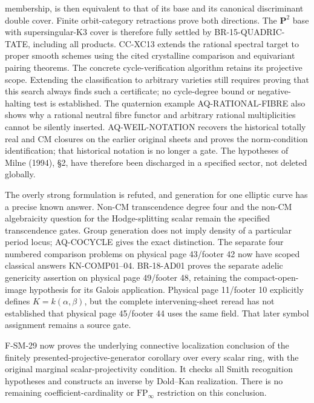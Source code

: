 \begin{description}[style=nextline,leftmargin=0pt]
membership, is then equivalent to that of its base and its canonical
discriminant double cover. Finite orbit-category retractions prove both
directions. The $\mathbf P^2$ base with supersingular-K3 cover is
therefore fully settled by BR-15-QUADRIC-TATE, including all products.
CC-XC13 extends the rational spectral target to proper smooth schemes
using the cited crystalline comparison and equivariant pairing theorems.
The concrete cycle-verification algorithm retains its projective scope. Extending the classification
to arbitrary varieties still requires proving that this search always
finds such a certificate; no cycle-degree bound or negative-halting
test is established. The
quaternion example AQ-RATIONAL-FIBRE also shows why a rational neutral
fibre functor and arbitrary rational multiplicities cannot be silently
inserted. AQ-WEIL-NOTATION recovers the historical totally real and CM
closures on the earlier original sheets and proves the norm-condition
identification; that historical notation is no longer a gate.
The hypotheses of Milne (1994), \S2, have therefore been
discharged in a specified sector, not deleted globally.
\item[Cote 18, scans 11--13 and 59: period density.]
The overly strong formulation is refuted, and generation for one
elliptic curve has a precise known answer. Non-CM transcendence degree
four and the non-CM algebraicity question for the Hodge-splitting
scalar remain the specified transcendence gates. Group generation
does not imply density of a particular period locus; AQ-COCYCLE
gives the exact distinction. The separate four numbered comparison
problems on physical page 43/footer 42 now have scoped classical
answers KN-COMP01--04. BR-18-AD01 proves the separate adelic
genericity assertion on physical page 49/footer 48, retaining the
compact-open-image hypothesis for its Galois application.
Physical page 11/footer 10 explicitly defines $K=k(\alpha,\beta)$,
but the complete intervening-sheet reread has not established that
physical page 45/footer 44 uses the same field. That later symbol
assignment remains a source gate.
\item[Cote 134-8, footers 47--54: abstract scope and ordinary right adjoint.]
F-SM-29 now proves the underlying connective localization conclusion
of the finitely presented-projective-generator corollary over every
scalar ring, with the original marginal scalar-projectivity condition.
It checks all Smith recognition hypotheses and constructs an inverse
by Dold--Kan realization. There is no remaining coefficient-cardinality
or $\mathrm{FP}_\infty$ restriction on this conclusion.

\end{description}
